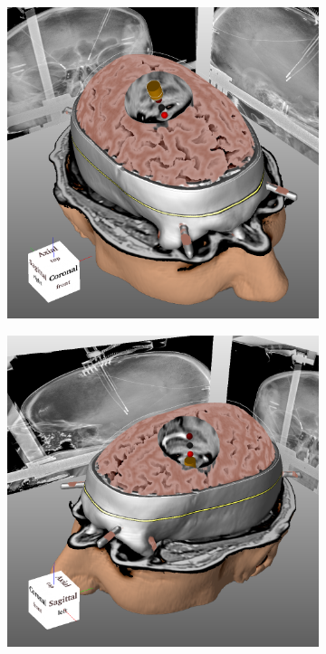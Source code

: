 \begin{figure}
\centering
\begin{subfigure}[b]{0.49\linewidth}
    \includegraphics[width=\linewidth]{figures/contributions/dbs/recording-3d-1.png}
\end{subfigure}
\hfill
\begin{subfigure}[b]{0.49\linewidth}
    \includegraphics[width=\linewidth]{figures/contributions/dbs/recording-3d-2.png}

\end{subfigure}
\end{figure}
